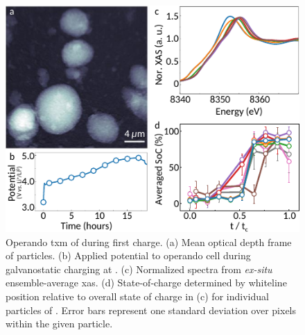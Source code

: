\documentclass{article}
\begin{document}
\begin{figure}
  \includegraphics{figures/nca_txm.pdf}
  \caption{Operando \gls{txm} of \nca{} during first charge. (a) Mean
    optical depth frame of \nca{} particles. (b) Applied potential to
    operando cell during galvanostatic charging at . (c) Normalized spectra from \emph{ex-situ}
    ensemble-average \gls{xas}. (d) State-of-charge determined by
    whiteline position relative to overall state of charge in (c) for
    individual particles of \nca{}. Error bars represent one standard
    deviation over pixels within the given particle.}
  \label{fig:txm-nca}
\end{figure}
\end{document}
